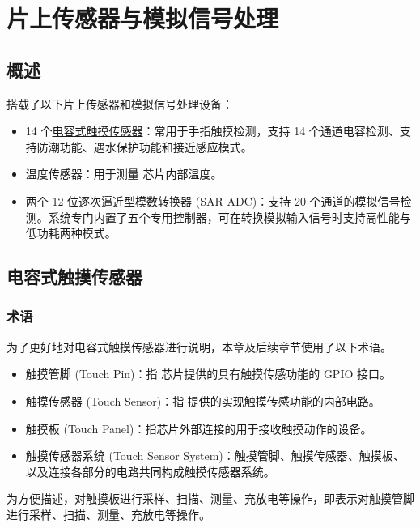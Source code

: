 \documentclass[main\_\_CN.tex]{subfiles}
\begin{document}

\ifglobal
\else
    {\let\clearpage\relax \listoftodos}
    \tableofcontents
\fi



\hypertarget{sensor}{}
\chapter{片上传感器与模拟信号处理}
\label{mod:sensor}


\section{概述}

\chipname{} 搭载了以下片上传感器和模拟信号处理设备：

\begin{itemize}
    \item 14 个\hyperref[sec:touch-sensor]{电容式触摸传感器}：常用于手指触摸检测，支持 14 个通道电容检测、支持防潮功能、遇水保护功能和接近感应模式。
    \item 温度传感器：用于测量 \chipname{} 芯片内部温度。
    \item 两个 12 位逐次逼近型模数转换器 (SAR ADC)：支持 20 个通道的模拟信号检测。系统专门内置了五个专用控制器，可在转换模拟输入信号时支持高性能与低功耗两种模式。
\end{itemize}

\section{电容式触摸传感器}\label{sec:touch-sensor}

\subsection{术语}

为了更好地对电容式触摸传感器进行说明，本章及后续章节使用了以下术语。

\begin{itemize}
    \item 触摸管脚 (Touch Pin)：指 \chipname{} 芯片提供的具有触摸传感功能的 GPIO 接口。
    \item 触摸传感器 (Touch Sensor)：指 \chipname{} 提供的实现触摸传感功能的内部电路。
    \item 触摸板 (Touch Panel)：指芯片外部连接的用于接收触摸动作的设备。
    \item 触摸传感器系统 (Touch Sensor System)：触摸管脚、触摸传感器、触摸板、以及连接各部分的电路共同构成触摸传感器系统。
\end{itemize}
\begin{tiplisting}
   为方便描述，对触摸板进行采样、扫描、测量、充放电等操作，即表示对触摸管脚进行采样、扫描、测量、充放电等操作。
\end{tiplisting}
\end{document}

